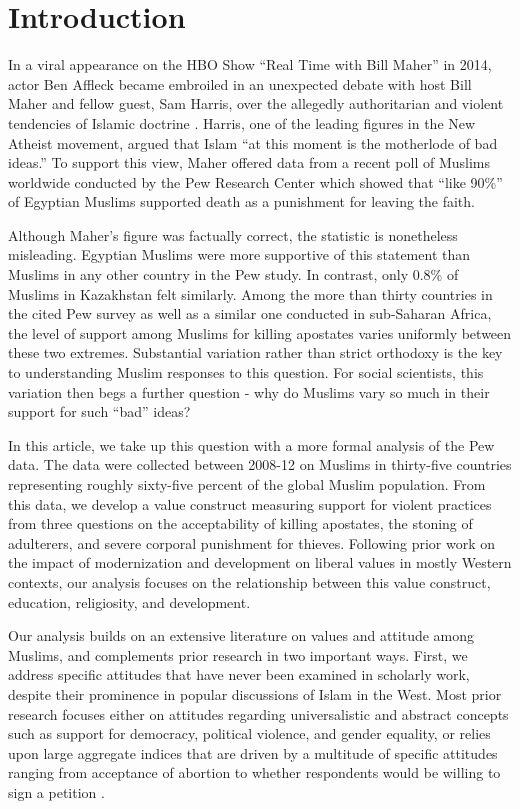 \documentclass[10pt,letterpaper]{article}
\begin{document}
\linenumbers

\section*{Introduction}

In a viral appearance on the HBO Show ``Real Time with Bill Maher'' in
2014, actor Ben Affleck became embroiled in an unexpected debate with
host Bill Maher and fellow guest, Sam Harris, over the allegedly
authoritarian and violent tendencies of Islamic doctrine
\cite{casey_real_2014}. Harris, one of the leading figures in the New
Atheist movement, argued that Islam ``at this moment is the motherlode
of bad ideas.'' To support this view, Maher offered data from a recent
poll of Muslims worldwide conducted by the Pew Research Center which
showed that ``like 90\%'' of Egyptian Muslims supported death as a
punishment for leaving the faith.

Although Maher's figure was factually correct, the statistic is
nonetheless misleading. Egyptian Muslims were more supportive of this
statement than Muslims in any other country in the Pew study. In
contrast, only 0.8\% of Muslims in Kazakhstan felt similarly. Among the
more than thirty countries in the cited Pew survey as well as a similar
one conducted in sub-Saharan Africa, the level of support among Muslims
for killing apostates varies uniformly between these two extremes.
Substantial variation rather than strict orthodoxy is the key to
understanding Muslim responses to this question. For social scientists,
this variation then begs a further question - why do Muslims vary so
much in their support for such ``bad'' ideas?

In this article, we take up this question with a more formal analysis of
the Pew data. The data were collected between 2008-12 on Muslims in
thirty-five countries representing roughly sixty-five percent of the
global Muslim population. From this data, we develop a value construct
measuring support for violent practices from three questions on the
acceptability of killing apostates, the stoning of adulterers, and
severe corporal punishment for thieves. Following prior work on the
impact of modernization and development on liberal values in mostly
Western contexts, our analysis focuses on the relationship between this
value construct, education, religiosity, and development.

Our analysis builds on an extensive literature on values and attitude
among Muslims, and complements prior research in two important ways.
First, we address specific attitudes that have never been examined in
scholarly work, despite their prominence in popular discussions of Islam
in the West. Most prior research focuses either on attitudes regarding
universalistic and abstract concepts such as support for democracy,
political violence, and gender equality, or relies upon large aggregate
indices that are driven by a multitude of specific attitudes ranging
from acceptance of abortion to whether respondents would be willing to
sign a petition \cite{inglehart_worldviews_2007}.
\end{document}
